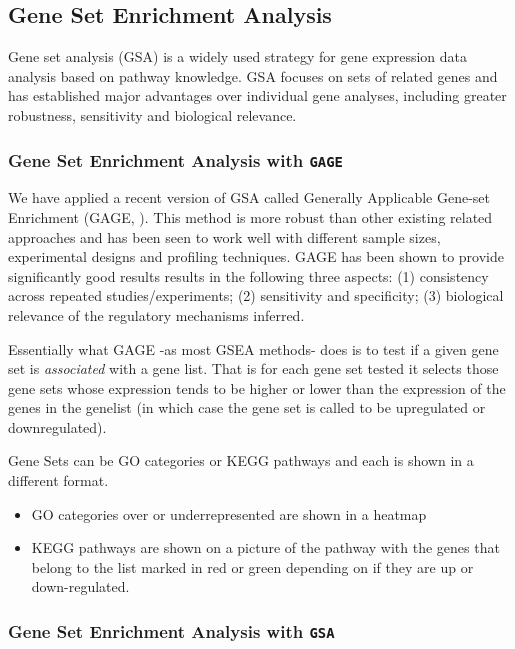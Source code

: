 \documentclass{article}\usepackage[]{graphicx}\usepackage[]{color}
\begin{document}
\subsection{Gene Set Enrichment Analysis}

Gene set analysis (GSA) is a widely used strategy for gene expression data analysis based on pathway knowledge. GSA focuses on sets of related genes and has established major advantages over individual gene analyses, including greater robustness, sensitivity and biological relevance. 

\subsubsection{Gene Set Enrichment Analysis with \texttt{GAGE}}

We have applied a recent version of GSA called Generally Applicable Gene-set Enrichment (GAGE, \cite{GAGE:2009}). This method is more robust than other existing related approaches and has been seen to work well with different sample sizes, experimental designs and profiling techniques. GAGE has been shown to provide significantly good results results in the following three aspects: (1) consistency across repeated studies/experiments; (2) sensitivity and specificity; (3) biological relevance of the regulatory mechanisms inferred.

Essentially what GAGE -as most GSEA methods- does is to test if a given gene set is \emph{associated} with a gene list. That is for each gene set tested it selects those gene sets whose expression tends to be higher or lower than the expression of the genes in the genelist (in which case the gene set is called to be upregulated or downregulated).

Gene Sets can be GO categories or KEGG pathways and each is shown in a different format.
\begin{itemize}
  \item GO categories over or underrepresented are shown in a heatmap
  \item KEGG pathways are shown on a picture of the pathway with the genes that belong to the list marked in red or green depending on if they are up or down-regulated.
\end{itemize}

\subsubsection{Gene Set Enrichment Analysis with \texttt{GSA}}
\end{document}
